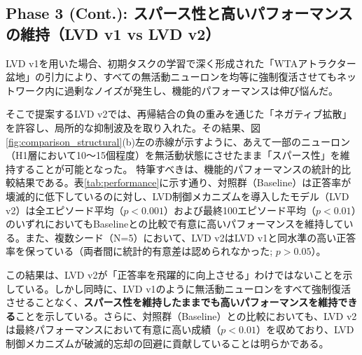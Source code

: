 \documentclass[submit]{ipsj}
\begin{document}
\subsection{Phase 3 (Cont.): スパース性と高いパフォーマンスの維持（LVD v1 vs LVD v2）}
LVD v1を用いた場合、初期タスクの学習で深く形成された「WTAアトラクター盆地」の引力により、すべての無活動ニューロンを均等に強制復活させてもネットワーク内に過剰なノイズが発生し、機能的パフォーマンスは伸び悩んだ。

そこで提案するLVD v2では、再帰結合の負の重みを通じた「ネガティブ拡散」を許容し、局所的な抑制波及を取り入れた。その結果、図\ref{fig:comparison_structural}(b)左の赤線が示すように、あえて一部のニューロン（H1層において10〜15個程度）を無活動状態にさせたまま「スパース性」を維持することが可能となった。
特筆すべきは、機能的パフォーマンスの統計的比較結果である。表\ref{tab:performance}に示す通り、対照群（Baseline）は正答率が壊滅的に低下しているのに対し、LVD制御メカニズムを導入したモデル（LVD v2）は全エピソード平均（$p < 0.001$）および最終100エピソード平均（$p < 0.01$）のいずれにおいてもBaselineとの比較で有意に高いパフォーマンスを維持している。また、複数シード（N=5）において、LVD v2はLVD v1と同水準の高い正答率を保っている（両者間に統計的有意差は認められなかった; $p > 0.05$）。



この結果は、LVD v2が「正答率を飛躍的に向上させる」わけではないことを示している。しかし同時に、LVD v1のように無活動ニューロンをすべて強制復活させることなく、\textbf{スパース性を維持したままでも高いパフォーマンスを維持できる}ことを示している。さらに、対照群（Baseline）との比較においても、LVD v2は最終パフォーマンスにおいて有意に高い成績（$p < 0.01$）を収めており、LVD制御メカニズムが破滅的忘却の回避に貢献していることは明らかである。
\end{document}
